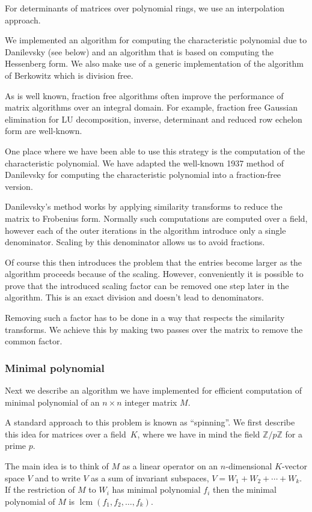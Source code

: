 \documentclass{sig-alternate-05-2015}
\DeclareMathOperator{\lcm}{lcm}
\begin{document}
For determinants of matrices over polynomial rings, we use an interpolation approach.

We implemented an algorithm for computing the characteristic polynomial due to
Danilevsky (see below) and an algorithm that is based on computing the Hessenberg
form. We also make use of a generic implementation of the algorithm of Berkowitz which
is division free. 

As is well known, fraction free algorithms often improve the performance of matrix
algorithms over an integral domain. For example, fraction free Gaussian elimination
for LU decomposition, inverse, determinant and reduced row echelon form
are well-known.

One place where we have been able to use this strategy is the computation
of the characteristic polynomial. We have adapted the well-known 1937 method
of Danilevsky for computing the characteristic polynomial into a fraction-free
version.

Danilevsky's method works by applying similarity transforms to reduce the
matrix to Frobenius form. Normally such computations are computed over a
field, however each of the outer iterations in the algorithm introduce only
a single denominator. Scaling by this denominator allows us to avoid
fractions.

Of course this then introduces the problem that the entries become larger
as the algorithm proceeds because of the scaling. However, conveniently
it is possible to prove that the introduced scaling factor can be removed 
one step later in the algorithm. This is an exact division and doesn't
lead to denominators.

Removing such a factor has to be done in a way that respects the
similarity transforms. We achieve this by making two passes over the matrix
to remove the common factor.

\subsubsection{Minimal polynomial}

Next we describe an algorithm we have implemented for efficient
computation of minimal polynomial of an $n\times n$ integer matrix $M$.

A standard approach to this problem is known as ``spinning''. 
We first describe this idea for matrices over a field~$K$, where we have
in mind the field $\mathbb{Z}/p\mathbb{Z}$ for a prime $p$.

The main idea is to think of $M$ as a linear operator on an $n$-dimensional
$K$-vector space $V$ and to write $V$ as a sum of invariant subspaces, 
$V = W_1 + W_2 + \cdots + W_k$. If the restriction of $M$ to $W_i$ has
minimal polynomial $f_i$ then the minimal polynomial of $M$ is
$\lcm(f_1, f_2, \ldots, f_k)$.
\end{document}
